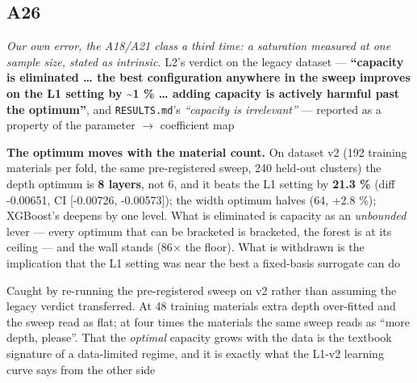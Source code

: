 \documentclass[10pt]{article}
\begin{document}
\subsection*{A26}\label{led:A26}
\begin{description}[leftmargin=0pt,itemsep=1pt]
\item[Claim withdrawn.] \emph{Our own error, the A18/A21 class a third time: a saturation measured at one sample size, stated as intrinsic.} L2's verdict on the legacy dataset --- \textbf{``capacity is eliminated \ldots{} the best configuration anywhere in the sweep improves on the L1 setting by \textasciitilde{}1 \% \ldots{} adding capacity is actively harmful past the optimum''}, and \texttt{RESULTS.md}'s \emph{``capacity is irrelevant''} --- reported as a property of the parameter $\rightarrow$ coefficient map
\item[Replaced with.] \textbf{The optimum moves with the material count.} On dataset v2 (192 training materials per fold, the same pre-registered sweep, 240 held-out clusters) the depth optimum is \textbf{8 layers}, not 6, and it beats the L1 setting by \textbf{21.3 \%} (diff -0.00651, CI [-0.00726, -0.00573]); the width optimum halves (64, +2.8 \%); XGBoost's deepens by one level. What is eliminated is capacity as an \emph{unbounded} lever --- every optimum that can be bracketed is bracketed, the forest is at its ceiling --- and the wall stands (86$\times$ the floor). What is withdrawn is the implication that the L1 setting was near the best a fixed-basis surrogate can do
\item[Why it was wrong.] Caught by re-running the pre-registered sweep on v2 rather than assuming the legacy verdict transferred. At 48 training materials extra depth over-fitted and the sweep read as flat; at four times the materials the same sweep reads as ``more depth, please''. That the \emph{optimal} capacity grows with the data is the textbook signature of a data-limited regime, and it is exactly what the L1-v2 learning curve says from the other side
\end{description}
\end{document}
